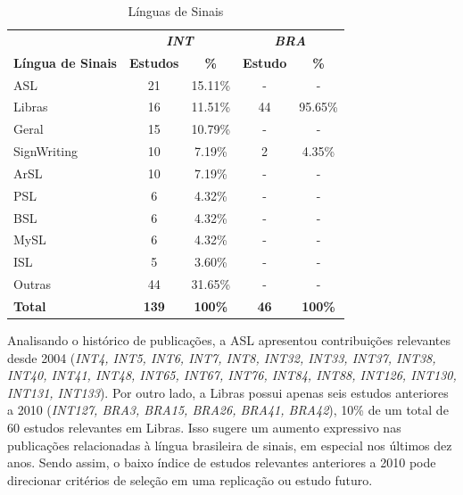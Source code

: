 \begin{table}[htbp]
\caption{Línguas de Sinais}
\label{results:table:sign-languages}
\centering
\begin{tabular}{lcccc}
\hline
           & \multicolumn{2}{c}{\textbf{\textit{INT}}} & \multicolumn{2}{c}{\textbf{\textit{BRA}}}  \\ \cline{2-5}

\textbf{Língua de Sinais} & \textbf{Estudos} & \textbf{\%}             & \textbf{Estudo} & \textbf{\%}               \\ \hline
ASL                       & 21               & 15.11\%                 & -               & -                         \\ 
Libras                    & 16               & 11.51\%                 & 44              & 95.65\%                   \\ 
Geral                     & 15               & 10.79\%                 & -               & -                         \\ 
SignWriting               & 10               & 7.19\%                  & 2               & 4.35\%                    \\ 
ArSL                      & 10               & 7.19\%                  & -               & -                         \\ 
PSL                       & 6                & 4.32\%                  & -               & -                         \\ 
BSL                       & 6                & 4.32\%                  & -               & -                         \\ 
MySL                      & 6                & 4.32\%                  & -               & -                         \\ 
ISL                       & 5                & 3.60\%                  & -               & -                         \\ 
Outras                    & 44               & 31.65\%                 & -               & -                         \\ 
\textbf{Total}            & \textbf{139}     & \textbf{100\%}          & \textbf{46}     & \textbf{100\%}            \\ \hline
\end{tabular}
\fautor
\end{table}

Analisando o histórico de publicações, a ASL apresentou contribuições relevantes desde 2004 (\textit{INT4, INT5, INT6, INT7, INT8, INT32, INT33, INT37, INT38, INT40, INT41, INT48, INT65, INT67, INT76, INT84, INT88, INT126, INT130, INT131, INT133}). Por outro lado, a Libras possui apenas seis estudos anteriores a 2010 (\textit{INT127, BRA3, BRA15, BRA26, BRA41, BRA42}), 10\% de um total de 60 estudos relevantes em Libras. Isso sugere um aumento expressivo nas publicações relacionadas à língua brasileira de sinais, em especial nos últimos dez anos. Sendo assim, o baixo índice de estudos relevantes anteriores a 2010 pode direcionar critérios de seleção em uma replicação ou estudo futuro.

